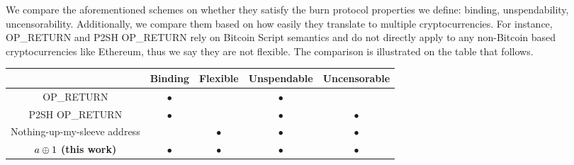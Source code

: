 We compare the aforementioned schemes on whether they satisfy the burn protocol properties we define: binding, unspendability, uncensorability. Additionally, we compare them based on how easily they translate to multiple cryptocurrencies. For instance, OP\_RETURN and P2SH OP\_RETURN rely on Bitcoin Script semantics and do not directly apply to any non-Bitcoin based cryptocurrencies like Ethereum, thus we say they are not flexible. The comparison is illustrated on the table that follows.

\begin{center}
    \newcommand{\y}{$\bullet$}
    \newcommand{\n}{}
    \begin{tabular}{ |c|c|c|c|c| }
     \hline
                                        & Binding & Flexible & Unspendable & Uncensorable \\
     \hline
     OP\_RETURN                         & \y      & \n       & \y          & \n \\
     P2SH OP\_RETURN                    & \y      & \n       & \y          & \y \\
     Nothing-up-my-sleeve address       & \n      & \y       & \y          & \y \\
     $a \oplus 1$ \textbf{(this work)}    & \y      & \y       & \y          & \y \\
     \hline
    \end{tabular}
\end{center}
